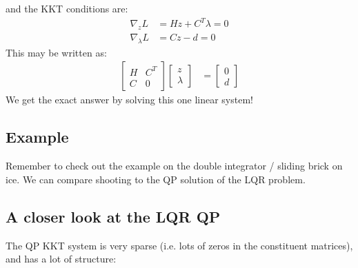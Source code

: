 and the KKT conditions are: 
\begin{align}
    \nabla_z L &= H z + C^T \lambda = 0 \\
    \nabla_{\lambda} L &= C z - d = 0
\end{align}
This may be written as:
\begin{align}
    \begin{bmatrix}
        H & C^T \\ 
        C & 0 
    \end{bmatrix}
    \begin{bmatrix}
        z \\
        \lambda
    \end{bmatrix}
    &= 
    \begin{bmatrix}
        0 \\
        d
    \end{bmatrix}
\end{align}
We get the exact answer by solving this one linear system! 

\subsection{Example}
Remember to check out the example on the double integrator / sliding brick on ice. We can compare shooting to the QP solution of the LQR problem. 

\subsection{A closer look at the LQR QP}
The QP KKT system is very sparse (i.e. lots of zeros in the constituent matrices), and has a lot of structure: 


